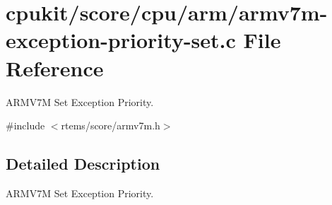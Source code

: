 \hypertarget{armv7m-exception-priority-set_8c}{}\section{cpukit/score/cpu/arm/armv7m-\/exception-\/priority-\/set.c File Reference}
\label{armv7m-exception-priority-set_8c}


A\+R\+M\+V7M Set Exception Priority.  


{\ttfamily \#include $<$rtems/score/armv7m.\+h$>$}\newline


\subsection{Detailed Description}
A\+R\+M\+V7M Set Exception Priority. 

